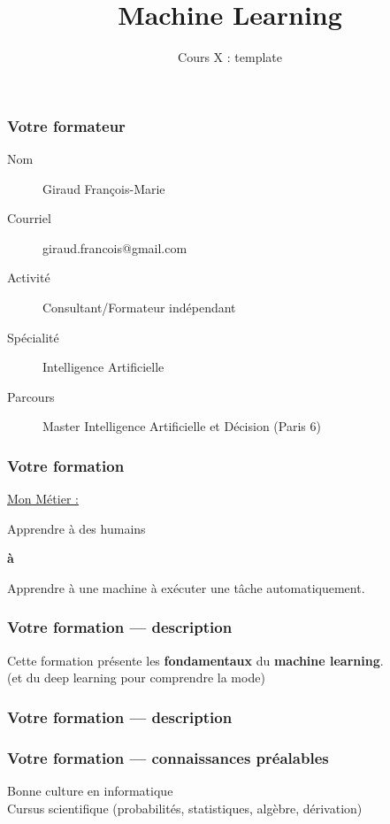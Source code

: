 \documentclass{formation}
\title{Machine Learning}
\subtitle{Cours X : template}
\begin{document}
\maketitle

\begin{frame}
  \frametitle{Votre formateur}
  \begin{description}
  \item[Nom] Giraud François-Marie
  \item[Courriel] giraud.francois@gmail.com
  \item[Activité] Consultant/Formateur indépendant
  \item[Spécialité] Intelligence Artificielle
  \item[Parcours] Master Intelligence Artificielle et Décision (Paris 6)
  \end{description}
\end{frame}

\begin{frame}
  \frametitle{Votre formation}
  \begin{center}\underline{Mon Métier :}\end{center}
  \begin{center}Apprendre à des humains\end{center}
  \begin{center}\textbf{à}\end{center}
  \begin{center}Apprendre à une machine à exécuter une tâche automatiquement.\end{center}
\end{frame}

\begin{frame}
  \frametitle{Votre formation — description}
  Cette formation présente les \textbf{fondamentaux} du \textbf{machine learning}. \\(et du deep learning pour comprendre la mode)
\end{frame}

\begin{frame}
  \frametitle{Votre formation — description}
\end{frame}

\begin{frame}
  \frametitle{Votre formation — connaissances préalables}
  Bonne culture en informatique \\
  Cursus scientifique (probabilités, statistiques, algèbre, dérivation)
\end{frame}
\end{document}
